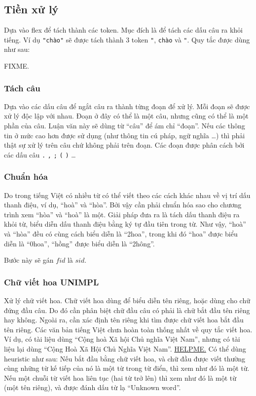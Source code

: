 \documentclass[a4paper,oneside]{book} %
\newcommand{\note}[1]{\underline{#1}}
\begin{document}
\subsection{Tiền xử lý}
\label{sub:preprocess}

Dựa vào flex để tách thành các token. Mục đích là để tách các dấu câu
ra khỏi tiếng. Ví dụ \verb#"chào"# sẽ được tách thành 3 token
\verb#"#, \verb#chào# và \verb#"#. Quy tắc được dùng như sau:

FIXME.

\subsubsection{Tách câu}

Dựa vào các dấu câu để ngắt câu ra thành từng đoạn để xử lý. Mỗi
đoạn sẽ được xử lý độc lập với nhau. Đoạn ở đây có thể là một câu,
nhưng cũng có thể là một 
phần của câu. Luận văn này sẽ dùng từ ``câu'' để ám chỉ ``đoạn''. Nếu
các thông tin ở mức cao hơn được sử dụng (như thông tin cú pháp, ngữ
nghĩa \ldots) thì phải thật sự xử lý trên câu chứ không phải trên
đoạn. Các đoạn được phân cách bởi các dấu câu \verb#.# \verb#,#
\verb#;# \verb#(# \verb#)# \ldots 

\subsubsection{Chuẩn hóa}

Do trong tiếng Việt có nhiều từ có thể viết theo các
cách khác nhau về vị trí dấu thanh điệu, ví dụ, ``hoà'' và
``hòa''. Bởi vậy cần phải chuẩn hóa sao cho chương trình xem ``hòa''
và ``hoà'' là một. Giải pháp đưa ra là tách dấu thanh điệu ra khỏi
từ, biểu diễn dấu thanh điệu bằng ký tự đầu tiên trong từ. Như vậy,
``hoà'' và ``hòa'' đều có cùng cách biểu diễn là ``2hoa'', trong khi
đó ``hoa'' được biểu diễn là ``0hoa'', ``hồng'' được biểu diễn là
``2hông''.

Bước này sẽ gán $fid$ là $sid$.

\subsubsection{Chữ viết hoa UNIMPL}

Xử lý chữ viết hoa. Chữ viết hoa dùng để biểu diễn tên riêng, hoặc
dùng cho chữ đứng đầu câu. Do đó cần phân biệt chữ đầu câu có phải là
chữ bắt đầu tên riêng hay không. Ngoài ra, cần xác định tên riêng khi
tìm được chữ viết hoa bắt đầu tên riêng. Các văn bản tiếng Việt chưa
hoàn toàn thống nhất về quy tắc viết hoa. Ví dụ, có tài liệu dùng
``Cộng hoà Xã hội Chủ nghĩa Việt Nam'', nhưng có tài liệu lại dùng
``Cộng Hoà Xã Hội Chủ Nghĩa Việt Nam''. \note{HELPME.}
Có thể dùng heuristic như sau: Nếu bắt đầu bằng chữ viết hoa, và chữ
đầu được viết thường cùng những từ kế tiếp của nó là một từ trong từ
điển, thì xem như đó là một từ. Nếu một chuỗi từ viết hoa liên tục
(hai từ trở lên) thì xem như đó là một từ (một tên riêng), và được
đánh dấu từ lạ ``Unknown word''.
\end{document}
